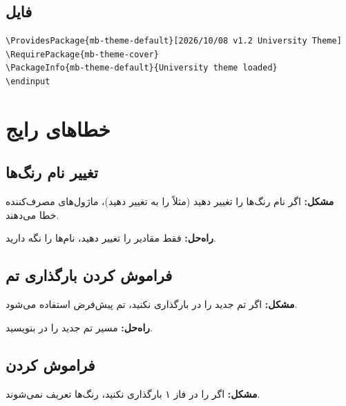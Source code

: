 \subsection{فایل }
\label{sec:custom-theme-example-loader}

\begin{latin}
\begin{verbatim}
\ProvidesPackage{mb-theme-default}[2026/10/08 v1.2 University Theme]
\RequirePackage{mb-theme-cover}
\PackageInfo{mb-theme-default}{University theme loaded}
\endinput
\end{verbatim}
\end{latin}


\section{خطاهای رایج}
\label{sec:custom-theme-mistakes}

\subsection{تغییر نام رنگ‌ها}
\label{sec:custom-theme-mistake-rename}

\textbf{مشکل:} اگر نام رنگ‌ها را تغییر
دهید (مثلاً  را به
 تغییر دهید)، ماژول‌های
مصرف‌کننده خطا می‌دهند.

\textbf{راه‌حل:} فقط مقادیر  را
تغییر دهید، نام‌ها را نگه دارید.

\subsection{فراموش کردن بارگذاری تم}
\label{sec:custom-theme-mistake-loading}

\textbf{مشکل:} اگر تم جدید را در
 بارگذاری نکنید، تم
پیش‌فرض استفاده می‌شود.

\textbf{راه‌حل:} مسیر تم جدید را در
 بنویسید.

\subsection{فراموش کردن }
\label{sec:custom-theme-mistake-colors}

\textbf{مشکل:} اگر 
را در فاز ۱ بارگذاری نکنید، رنگ‌ها
تعریف نمی‌شوند.

